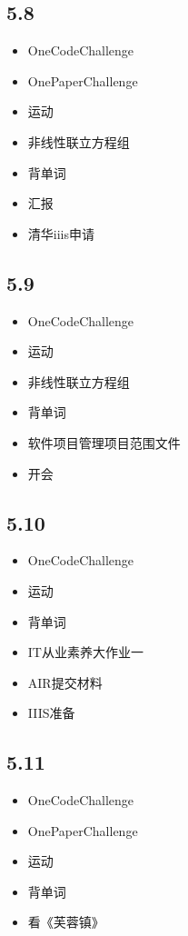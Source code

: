 \documentclass[UTF8]{ctexart}
\begin{document}
\subsection*{5.8}
\begin{itemize}
    \item OneCodeChallenge
    \item OnePaperChallenge
    \item 运动
    \item 非线性联立方程组
    \item 背单词
    \item 汇报
    \item 清华iiis申请
\end{itemize}

\subsection*{5.9}
\begin{itemize}
    \item OneCodeChallenge
    \item 运动
    \item 非线性联立方程组
    \item 背单词
    \item 软件项目管理项目范围文件
    \item 开会
\end{itemize}

\subsection*{5.10}
\begin{itemize}
    \item OneCodeChallenge
    \item 运动
    \item 背单词
    \item IT从业素养大作业一
    \item AIR提交材料
    \item IIIS准备
\end{itemize}

\subsection*{5.11}
\begin{itemize}
    \item OneCodeChallenge
    \item OnePaperChallenge
    \item 运动
    \item 背单词
    \item 看《芙蓉镇》
\end{itemize}
\end{document}
